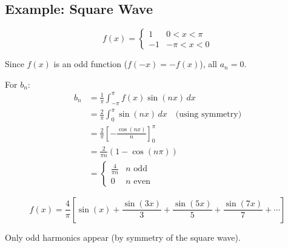 \subsection{Example: Square Wave}

\begin{equation}
    f(x) = \begin{cases} 1 & 0 < x < \pi \\ -1 & -\pi < x < 0 \end{cases}
\end{equation}


Since $f(x)$ is an odd function ($f(-x) = -f(x)$), all $a_n = 0$.

For $b_n$:
\begin{align*}
    b_n &= \frac{1}{\pi} \int_{-\pi}^{\pi} f(x) \sin(nx) \, dx \\
    &= \frac{2}{\pi} \int_{0}^{\pi} \sin(nx) \, dx \quad \text{(using symmetry)} \\
    &= \frac{2}{\pi} \left[-\frac{\cos(nx)}{n}\right]_0^{\pi} \\
    &= \frac{2}{\pi n} (1 - \cos(n\pi)) \\
    &= \begin{cases} \frac{4}{\pi n} & n \text{ odd} \\ 0 & n \text{ even} \end{cases}
\end{align*}

\begin{equation}
    f(x) = \frac{4}{\pi}\left[\sin(x) + \frac{\sin(3x)}{3} + \frac{\sin(5x)}{5} + \frac{\sin(7x)}{7} + \cdots\right]
\end{equation}

Only odd harmonics appear (by symmetry of the square wave).

